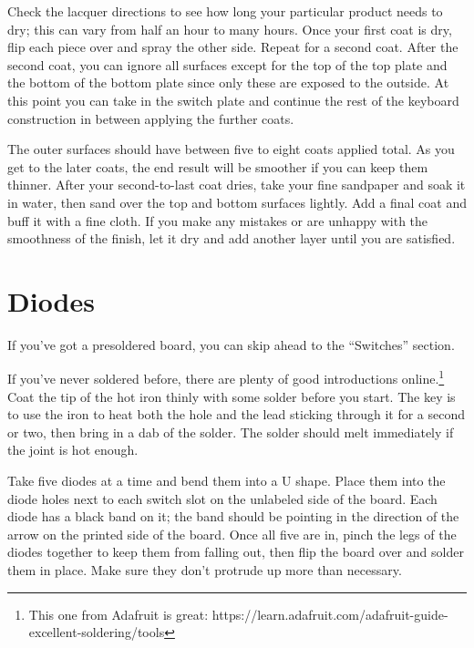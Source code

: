 \documentclass[landscape,twocolumn]{article}
\begin{document}
\vspace{1em}

Check the lacquer directions to see how long your particular product
needs to dry; this can vary from half an hour to many hours. Once your
first coat is dry, flip each piece over and spray the other
side. Repeat for a second coat. After the second coat, you can ignore
all surfaces except for the top of the top plate and the bottom of the
bottom plate since only these are exposed to the outside. At this
point you can take in the switch plate and continue the rest of the
keyboard construction in between applying the further coats.

\vspace{1em}

The outer surfaces should have between five to eight coats applied
total. As you get to the later coats, the end result will be smoother
if you can keep them thinner. After your second-to-last coat dries,
take your fine sandpaper and soak it in water, then sand over the top
and bottom surfaces lightly. Add a final coat and buff it with a fine
cloth. If you make any mistakes or are unhappy with the smoothness of
the finish, let it dry and add another layer until you are satisfied.

\section{Diodes}

If you've got a presoldered board, you can skip ahead to the
``Switches'' section.

\vspace {1em}

If you've never soldered before, there are plenty of good
introductions online.\footnote{This one from Adafruit is great:
  https://learn.adafruit.com/adafruit-guide-excellent-soldering/tools}
Coat the tip of the hot iron thinly with some solder before you
start. The key is to use the iron to heat both the hole and the lead
sticking through it for a second or two, then bring in a dab of the
solder. The solder should melt immediately if the joint is hot enough.

\vspace{1em}

Take five diodes at a time and bend them into a U shape. Place them
into the diode holes next to each switch slot on the unlabeled side of
the board. Each diode has a black band on it; the band should be
pointing in the direction of the arrow on the printed side of
the board. Once all five are in, pinch the legs of the diodes together
to keep them from falling out, then flip the board over and solder
them in place. Make sure they don't protrude up more than necessary.
\end{document}
